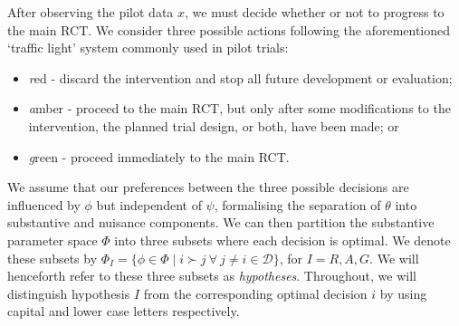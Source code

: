 \documentclass{article} %
\begin{document}
After observing the pilot data $x$, we must decide whether or not to progress to the main RCT. We consider three possible actions following the aforementioned `traffic light' system commonly used in pilot trials: 
\begin{itemize}
\item \emph{r}ed - discard the intervention and stop all future development or evaluation; 
\item \emph{a}mber - proceed to the main RCT, but only after some modifications to the intervention, the planned trial design, or both, have been made; or
\item \emph{g}reen - proceed immediately to the main RCT.
\end{itemize}
 
We assume that our preferences between the three possible decisions are influenced by $\phi$ but independent of $\psi$, formalising the separation of $\theta$ into substantive and nuisance components. We can then partition the substantive parameter space $\Phi$ into three subsets where each decision is optimal. We denote these subsets by $\Phi_{I} = \{ \phi \in \Phi \mid i \succ j ~\forall ~j \neq i \in \mathcal{D} \}$, for $I = R, A, G$. We will henceforth refer to these three subsets as \emph{hypotheses}. Throughout, we will distinguish hypothesis $I$ from the corresponding optimal decision $i$ by using capital and lower case letters respectively.
\end{document}

